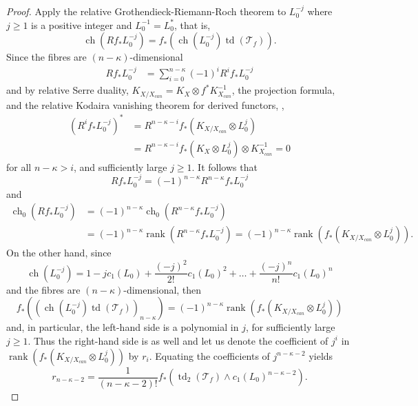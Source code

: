\documentclass[12pt]{article}
\numberwithin{equation}{section}
\newcommand{\T}{\mathcal{T}}
\DeclareMathOperator{\ch}{ch}
\DeclareMathOperator{\td}{td}
\DeclareMathOperator{\rank}{rank}
\begin{document}
\begin{proof}
Apply the relative Grothendieck-Riemann-Roch theorem to $L_0^{-j}$ where $j \geq 1$ is a positive integer and $L_0^{-1} = L_0^*$, that is,
\begin{equation*}
    \ch(R f_* L_0^{-j}) = f_* (\ch(L_0^{-j}) \td(\T_f)).
\end{equation*}
Since the fibres are $(n-\kappa)$-dimensional
\begin{align*}
    R f_* L_0^{-j} &= \sum_{i = 0}^{n-\kappa} (-1)^i R^i f_* L_0^{-j}
\end{align*}
and by relative Serre duality, $K_{X/X_{can}} = K_X \otimes f^* K_{X_{can}}^{-1}$, the projection formula, and the relative Kodaira vanishing theorem for derived functors, \cite[Cor. 1.3.]{F26},
\begin{align*}
    (R^i f_* L_0^{-j})^* &= R^{n-\kappa-i} f_*( K_{X/X_{can}} \otimes L_0^{j})\\
    &= R^{n-\kappa-i} f_*(K_X \otimes L_0^j)\otimes K_{X_{can}}^{-1} = 0
\end{align*}
for all $n-\kappa > i$, and sufficiently large $j \geq 1$. It follows that 
\begin{equation*}
    R f_* L_0^{-j} = (-1)^{n-\kappa} R^{n-\kappa} f_* L_0^{-j}
\end{equation*}
and
\begin{align*}
    \ch_0(R f_* L_0^{-j}) &= (-1)^{n-\kappa} \ch_0 (R^{n-\kappa} f_* L_0^{-j})\\
    &= (-1)^{n-\kappa}\rank(R^{n-\kappa} f_* L_0^{-j}) = (-1)^{n-\kappa} \rank(f_*(K_{X/X_{can}}\otimes L_0^j)).
\end{align*}
On the other hand, since
\begin{equation*}
    \ch(L_0^{-j}) = 1 - j c_1(L_0) + \frac{(-j)^2}{2!} c_1(L_0)^2 + \dots + \frac{(-j)^n}{n!} c_1(L_0)^n
\end{equation*}
and the fibres are $(n-\kappa)$-dimensional, then
\begin{equation*}
    f_* ((\ch(L_0^{-j}) \td(\T_f))_{n-\kappa}) = (-1)^{n-\kappa} \rank(f_*(K_{X/X_{can}}\otimes L_0^j))
\end{equation*}
and, in particular, the left-hand side is a polynomial in $j$, for sufficiently large $j \geq 1$. Thus the right-hand side is as well and let us denote the coefficient of $j^i$ in $\rank( f_*(K_{X/X_{can}}\otimes L_0^j))$ by $r_i$. Equating the coefficients of $j^{n-\kappa-2}$ yields
\begin{equation*}
    r_{n-\kappa-2} = \frac{1}{(n-\kappa-2)!}f_*\left(\td_2(\T_f) \wedge c_1(L_0)^{n-\kappa-2}\right).

\end{equation*}
\end{proof}
\end{document}
